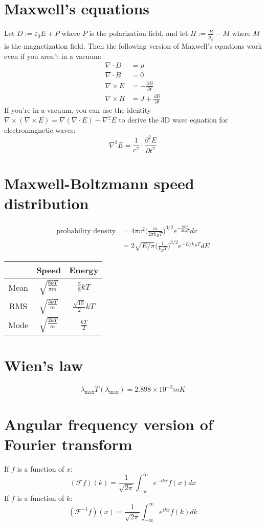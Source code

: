 \documentclass[12pt]{article}
\begin{document}
\section{Maxwell's equations}
Let $D := \varepsilon_0 E + P$ where $P$ is the polarization field, and let $H := \frac{B}{\mu_0} - M$ where $M$ is the magnetization field. Then the following version of Maxwell's equations work even if you aren't in a vacuum:
\begin{align*}
    \nabla \cdot D &= \rho \\
    \nabla \cdot B &= 0 \\
    \nabla \times E &= - \frac{\partial B}{\partial t} \\
    \nabla \times H &= J + \frac{\partial D}{\partial t}
\end{align*}
If you're in a vacuum, you can use the identity $\nabla \times (\nabla \times E) = \nabla (\nabla \cdot E) - \nabla^2 E$ to derive the 3D wave equation for electromagnetic waves:
\[ \nabla^2 E = \frac{1}{c^2} \cdot \frac{\partial^2 E}{\partial t^2} \]

\section{Maxwell-Boltzmann speed distribution}
\begin{align*}
    \text{probability density} &= 4 \pi v^2 \Big( \frac{m}{2 \pi k_B T} \Big)^{3/2} e^{-\frac{m v^2}{2 k_B T}} dv \\
                               &= 2 \sqrt{E/\pi} \Big( \frac{1}{k_B T} \Big)^{3/2} e^{-E / k_B T} dE
\end{align*}

\begin{tabular}{ c|c|c } 
    & Speed & Energy \\
    \hline
    Mean & $\sqrt{ \frac{8kT}{\pi m} }$ & $ \frac{3}{2} kT$ \\ 
    \hline
    RMS & $\sqrt{ \frac{3kT}{m} }$ & $ \frac{\sqrt{15}}{2} kT$ \\ 
    \hline
    Mode & $\sqrt{ \frac{2kT}{m} }$ & $\frac{kT}{2}$ \\ 
\end{tabular}

\section{Wien's law}
\[ \lambda_\text{max} T(\lambda_\text{max}) = 2.898 \times 10^{-3} mK \]

\section{Angular frequency version of Fourier transform}
If $f$ is a function of $x$:
\[ (\mathcal{F}f)(k) = \frac{1}{\sqrt{2 \pi}} \int_{-\infty}^\infty e^{-ikx}f(x) dx \]
If $f$ is a function of $k$:
\[ (\mathcal{F}^{-1}f)(x) = \frac{1}{\sqrt{2 \pi}} \int_{-\infty}^\infty e^{ikx}f(k) dk \]
\end{document}
